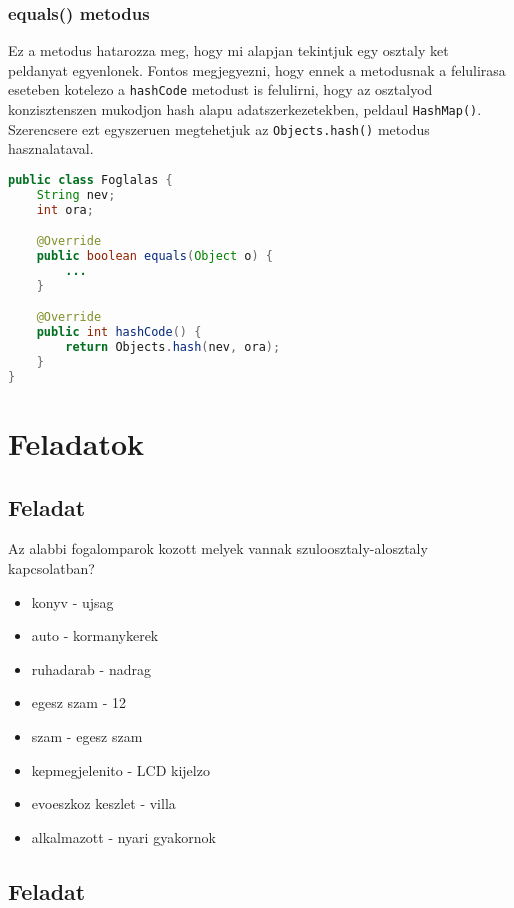 \documentclass{article}
\let\l\lstinline
\begin{document}
\subsubsection{equals() metodus}

Ez a metodus hatarozza meg, hogy mi alapjan tekintjuk egy osztaly ket peldanyat egyenlonek.
Fontos megjegyezni, hogy ennek a metodusnak a felulirasa eseteben kotelezo a \l{hashCode} metodust is felulirni, hogy az osztalyod konzisztenszen mukodjon hash alapu adatszerkezetekben, peldaul \l{HashMap()}.
Szerencsere ezt egyszeruen megtehetjuk az \l{Objects.hash()} metodus hasznalataval.

\begin{lstlisting}[language=Java, caption=Override annotacio hasznalata]
public class Foglalas {
    String nev;
    int ora;

    @Override
    public boolean equals(Object o) {
        ...
    }

    @Override
    public int hashCode() {
        return Objects.hash(nev, ora);
    }
}
\end{lstlisting}

\newpage

\section{Feladatok}

\subsection{Feladat}

Az alabbi fogalomparok kozott melyek vannak szuloosztaly-alosztaly kapcsolatban?
\begin{itemize}
    \item konyv - ujsag
    \item auto - kormanykerek
    \item ruhadarab - nadrag
    \item egesz szam - 12
    \item szam - egesz szam
    \item kepmegjelenito - LCD kijelzo
    \item evoeszkoz keszlet - villa
    \item alkalmazott - nyari gyakornok
\end{itemize}

\subsection{Feladat}
\end{document}
